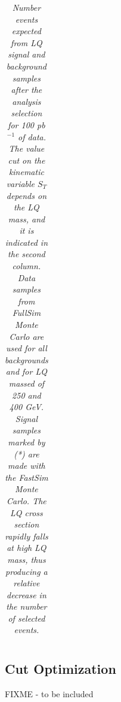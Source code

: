 \begin{table}[htbp]
\begin{center}
\begin{tabular}{|ccc||cccc|}
\hline\hline
\end{tabular}
\end{center}
\caption{\small \sl Number events expected from LQ signal and background samples after the analysis selection for 100 pb$^{-1}$ of data.
The value cut on the kinematic variable $S_T$ depends on the LQ mass, and it is indicated in the second column.
Data samples from FullSim Monte Carlo are used for all backgrounds and for LQ massed of 250 and 400 GeV. Signal samples marked by (*) are
made with the FastSim Monte Carlo.
The LQ cross section rapidly falls at high LQ mass, thus producing a relative decrease in the number of selected events. } 
\label{tab:EventSelSummary}
\end{table}



\subsection{Cut Optimization} \label{sec:cutOptimization}

FIXME - to be included

%



